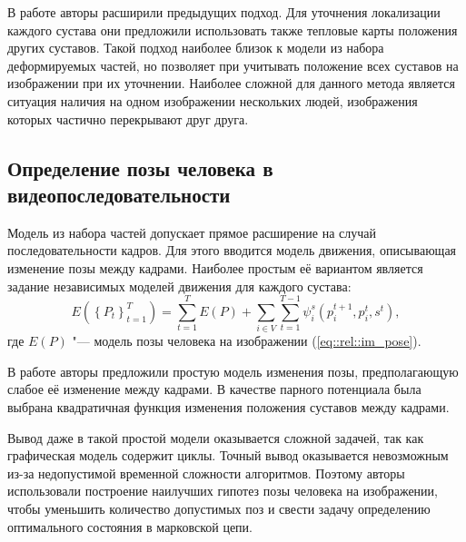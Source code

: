 В работе \cite{bulat2016human} авторы расширили предыдущих подход. Для уточнения локализации каждого сустава они предложили использовать также тепловые карты положения других суставов. Такой подход наиболее близок к модели из набора деформируемых частей, но позволяет при учитывать положение всех суставов на изображении при их уточнении. Наиболее сложной для данного метода является ситуация наличия на одном изображении нескольких людей, изображения которых частично перекрывают друг друга.
 
\subsection{Определение позы человека в видеопоследовательности}

Модель из набора частей допускает прямое расширение на случай последовательности кадров. Для этого вводится модель движения, описывающая изменение позы между кадрами. Наиболее простым её вариантом является задание независимых моделей движения для каждого сустава:
\begin{equation}
	E(\left\{P_t\right\}_{t=1}^T) = \sum_{t=1}^T E(P) + \sum_{i\in V}\sum_{t=1}^{T-1}\psi_i^s(p_i^{t+1}, p_i^t, s^t),
\end{equation}
где $E(P)$ "--- модель позы человека на изображении (\ref{eq::rel::im_pose}).

В работе \cite{park2011n} авторы предложили простую модель изменения позы, предполагающую слабое её изменение между кадрами. В качестве парного потенциала была выбрана квадратичная функция изменения положения суставов между кадрами.

Вывод даже в такой простой модели оказывается сложной задачей, так как графическая модель содержит циклы. Точный вывод оказывается невозможным из-за недопустимой временной сложности алгоритмов. Поэтому авторы \cite{park2011n} использовали построение наилучших гипотез позы человека на изображении, чтобы уменьшить количество допустимых поз и свести задачу определению оптимального состояния в марковской цепи.